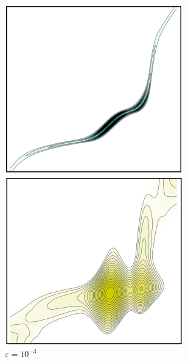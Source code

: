 \documentclass[cn,10pt,math=newtx,citestyle=gb7714-2015,bibstyle=gb7714-2015]{elegantbook}
\begin{document}
\begin{figure}[H]
\begin{minipage}{0.8\linewidth}
\begin{minipage}{0.19\linewidth}
		\caption*{$\varepsilon=5\times 10^{-3}$}
	\end{minipage}
	\begin{minipage}{0.19\linewidth}
		\centering
		    \includegraphics[width=\linewidth]{figure/fig4.6/5.png}
		\caption*{$\varepsilon=10^{-3}$}
	\end{minipage}
	\vspace{.5em}
	\begin{minipage}{0.19\linewidth}
		\centering
		    \includegraphics[width=\linewidth]{figure/fig4.6/6.png}

\end{minipage}
\end{minipage}
\end{figure}
\end{document}
